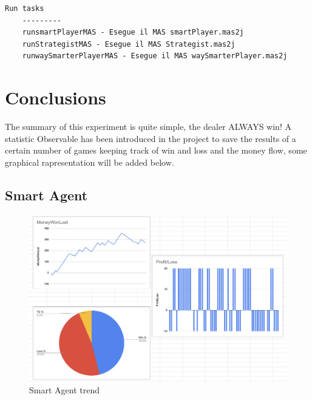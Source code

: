 \begin{lstlisting}[style=gradlestyle, caption=Runnable tasks, label=lst:bash_tasks]
    Run tasks
    ---------
    runsmartPlayerMAS - Esegue il MAS smartPlayer.mas2j
    runStrategistMAS - Esegue il MAS Strategist.mas2j
    runwaySmarterPlayerMAS - Esegue il MAS waySmarterPlayer.mas2j
\end{lstlisting}

\chapter{Conclusions}

The summary of this experiment is quite simple, the dealer ALWAYS win! A statistic Observable has been introduced in the project to save the results of a certain number of games keeping track of win and loss and the money flow, some graphical rapresentation will be added below. 

\section{Smart Agent}
\begin{figure}[!htb]
    \centering
    \includegraphics[scale=0.35]{report/img/smart-statistic.png}
    \caption{Smart Agent trend}
    \label{fig:classDiagram}
\end{figure}

